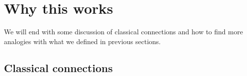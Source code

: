 \section{Why this works}

\begin{comment}
The arguments in this note flowed from a simple hypothesis: that \( \ap \) is analogous to \( d \), the exterior derivative. For example:

\begin{enumerate}
\item The derivative of a function is its action on tangent vectors, and this is an infinitesimal limit of its action on paths (though these classical ``paths'' consist of points, which is why \( df \) is entailed in the data of \( f \) on points).
\item Connections are \emph{not} entailed in the data of a classical principal bundle. But they do answer the question: what does the bundle do on paths, i.e. how do we transport along a path? In this sense a connection might be the derivative of a bundle (and curvature the derivative of the connection).
\item In HoTT the transport function on fibers along a path is part of the type family. But of course if we are working inductively on a HIT, there is a moment after we define the family on points and before we define it on paths. In this sense connections are also extra structure.
\item de Rham complexes and cohomology are graded by dimension, but in HoTT this data is unified into a higher groupoid. Is a complex an infinitesimal limit of a groupoid?
\item The Leibniz rule (product rule) for real-valued smooth functions \( f,g:M\to\rr \) is \( d(fg)=fdg + gdf \). In HoTT given functions \( f,g:M\to H \) for any type \( M \) and H-space \( H \) with multiplication \( * \), and path \( p:x=_M y \), we have \( f(p)* g(p) = (f(x)* g(p))\cdot (f(p)*g(y)) \), where we say \( f(p) \) instead of \( \ap(p)(f) \). The Leibniz formula is so often treated as an axiom that it was surprising to the author to see this relationship with whiskering.
\end{enumerate}
\end{comment}

We will end with some discussion of classical connections and how to find more analogies with what we defined in previous sections.

\subsection{Classical connections}

